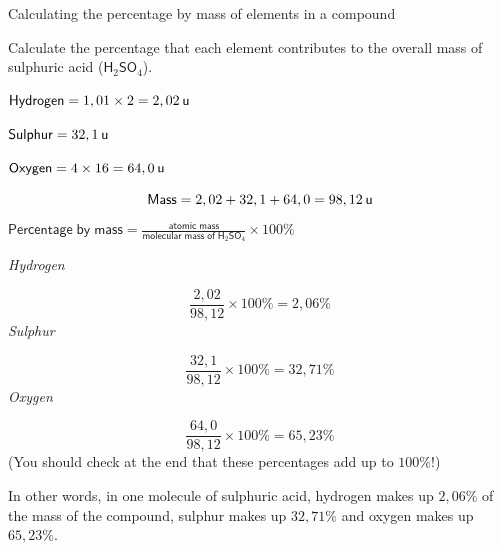      \begin{wex}{Calculating the percentage by mass of elements in a compound }
{
      \label{m38712*probfhsst!!!underscore!!!id902}
      \label{m38712*id280520}Calculate the percentage that each element contributes to the overall mass of sulphuric acid (${\mathsf{H}}_{2}{\mathsf{SO}}_{4}$).\par 
      \vspace{5pt}}
{
      \label{m38712*id280575}$\mathsf{Hydrogen}=1,01\ensuremath{\times}2=2,02\phantom{\rule{2pt}{0ex}}\mathsf{u}$\par 
      \label{m38712*id280588}$\mathsf{Sulphur}=32,1\phantom{\rule{2pt}{0ex}}\mathsf{u}$\par 
      \label{m38712*id280591}$\mathsf{Oxygen}=4\ensuremath{\times}16=64,0\phantom{\rule{2pt}{0ex}}\mathsf{u}$\par 
      \label{m38712*id280629}\nopagebreak\noindent{}
        
    \begin{equation*}
    \mathsf{Mass}=2,02 + 32,1 + 64,0 =98,12\phantom{\rule{2pt}{0ex}}\mathsf{u}
      \end{equation*}
      \label{m38712*id280688}$\mathsf{Percentage\; by\; mass}=\frac{\mathsf{atomic\; mass}}{\mathsf{molecular\; mass\; of\; H}{}_{2}\mathsf{SO}{}_{4}}\ensuremath{\times}100\%$\par 
      \label{m38712*id280729}
        \textsl{Hydrogen}
      \par 
      \label{m38712*id280735}\nopagebreak\noindent{}
        
    \begin{equation*}
    \frac{2,02}{98,12}\ensuremath{\times}100\%=2,06\%
      \end{equation*}
      \label{m38712*id280780}
        \textsl{Sulphur}
      \par 
      \label{m38712*id280786}\nopagebreak\noindent{}
        
    \begin{equation*}
    \frac{32,1}{98,12}\ensuremath{\times}100\%=32,71\%
      \end{equation*}
      \label{m38712*id280831}
        \textsl{Oxygen}
      \par 
      \label{m38712*id280837}\nopagebreak\noindent{}
        
    \begin{equation*}
    \frac{64,0}{98,12}\ensuremath{\times}100\%=65,23\%
      \end{equation*}
      \label{m38712*id280876}(You should check at the end that these percentages add up to $100\%$!)\par 
      \label{m38712*id280880}In other words, in one molecule of sulphuric acid, hydrogen makes up $2,06\%$ of the mass of the compound, sulphur makes up $32,71\%$ and oxygen makes up $65,23\%$. 
}
    \end{wex}
